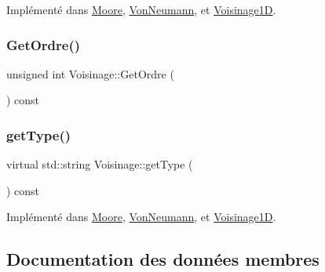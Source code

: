 Implémenté dans \mbox{\hyperlink{class_moore_a29a0a8f7b132429b5cbea4fdafcfd045}{Moore}}, \mbox{\hyperlink{class_von_neumann_a7e85faf5f9bedb3d1fef9b9536aeba4f}{Von\+Neumann}}, et \mbox{\hyperlink{class_voisinage1_d_afdc267252af9b94fe26f5414d1472265}{Voisinage1D}}.

\mbox{\label{class_voisinage_a589264908cd4f82538e950eb4659893a}} 
\subsubsection{\texorpdfstring{Get\+Ordre()}{GetOrdre()}}
{\footnotesize\ttfamily unsigned int Voisinage\+::\+Get\+Ordre (\begin{DoxyParamCaption}{ }\end{DoxyParamCaption}) const\hspace{0.3cm}{\ttfamily [inline]}}

\mbox{\label{class_voisinage_a9853dfde1a68f5bb6333a8db001411a0}} 
\subsubsection{\texorpdfstring{get\+Type()}{getType()}}
{\footnotesize\ttfamily virtual std\+::string Voisinage\+::get\+Type (\begin{DoxyParamCaption}{ }\end{DoxyParamCaption}) const\hspace{0.3cm}{\ttfamily [pure virtual]}}



Implémenté dans \mbox{\hyperlink{class_moore_af0398509c1540f611c000579714fbce7}{Moore}}, \mbox{\hyperlink{class_von_neumann_ab969490492cff92c8e0efcfc72e492b9}{Von\+Neumann}}, et \mbox{\hyperlink{class_voisinage1_d_a92cc6dea76b6426d3cdaf849d18d205c}{Voisinage1D}}.



\subsection{Documentation des données membres}
\mbox{\label{class_voisinage_a336bf2df48d4ee7c8a32c6d583bb10aa}} 
